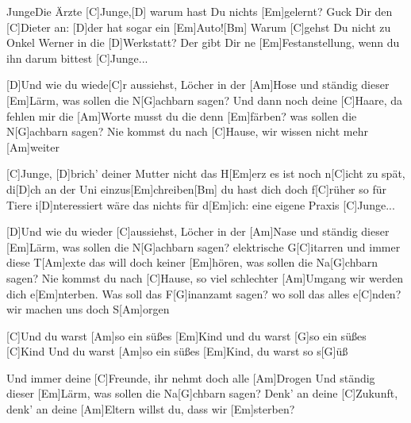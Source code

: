\documentclass[../main.tex]{subfiles}
\begin{document}
\begin{song}[6]{Junge}{Die Ärzte}{}
[C]Junge,[D]  warum hast Du nichts [Em]gelernt?
Guck Dir den [C]Dieter an: [D]der hat sogar ein [Em]Auto![Bm]{\hh}
Warum [C]gehst Du nicht zu Onkel Werner in die [D]Werkstatt?
Der gibt Dir ne [Em]Festanstellung, wenn du ihn darum bittest
[C]Junge...

[D]Und wie du wiede[C]r aussiehst, Löcher in der [Am]Hose 
und ständig dieser [Em]Lärm, was sollen die N[G]achbarn sagen?
Und dann noch deine [C]Haare, da fehlen mir die [Am]Worte
musst du die denn [Em]färben? was sollen die N[G]achbarn sagen?
Nie kommst du nach [C]Hause, wir wissen nicht mehr [Am]weiter

[C]Junge, [D]brich’ deiner Mutter nicht das H[Em]erz
es ist noch n[C]icht zu spät, di[D]ch an der Uni einzus[Em]chreiben[Bm]{\hh}
du hast dich doch f[C]rüher so für Tiere i[D]nteressiert
wäre das nichts für d[Em]ich: eine eigene Praxis
[C]Junge...

[D]Und wie du wieder [C]aussiehst, Löcher in der [Am]Nase
und ständig dieser [Em]Lärm, was sollen die N[G]achbarn sagen?
elektrische G[C]itarren und immer diese T[Am]exte
das will doch keiner [Em]hören, was sollen die Na[G]chbarn sagen?
Nie kommst du nach [C]Hause, so viel schlechter [Am]Umgang
wir werden dich e[Em]nterben. Was soll das F[G]inanzamt sagen?
wo soll das alles e[C]nden? wir machen uns doch S[Am]orgen

[C]Und du warst [Am]so ein süßes [Em]Kind und du warst [G]so ein süßes [C]Kind 
Und du warst [Am]so ein süßes [Em]Kind, du warst so s[G]{ü}ß

Und immer deine [C]Freunde, ihr nehmt doch alle [Am]Drogen
Und ständig dieser [Em]Lärm, was sollen die Na[G]chbarn sagen?
Denk’ an deine [C]Zukunft, denk’ an deine [Am]Eltern
willst du, dass wir [Em]sterben?
\end{song}
\end{document}
